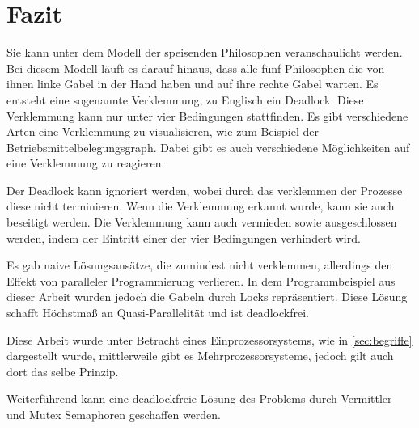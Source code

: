 \chapter{Fazit}
\label{fazit}

Sie kann unter dem Modell der speisenden Philosophen veranschaulicht werden. Bei diesem Modell läuft es darauf hinaus, dass alle fünf Philosophen die von ihnen linke Gabel in der Hand haben und auf ihre rechte Gabel warten. Es entsteht eine sogenannte Verklemmung, zu Englisch ein Deadlock. Diese Verklemmung kann nur unter vier Bedingungen stattfinden. Es gibt verschiedene Arten eine Verklemmung zu visualisieren, wie zum Beispiel der Betriebsmittelbelegungsgraph. Dabei gibt es auch verschiedene Möglichkeiten auf eine Verklemmung zu reagieren. 

Der Deadlock kann ignoriert werden, wobei durch das verklemmen der Prozesse diese nicht terminieren.
Wenn die Verklemmung erkannt wurde, kann sie auch beseitigt werden.
Die Verklemmung kann auch vermieden sowie ausgeschlossen werden, indem der Eintritt einer der vier Bedingungen verhindert wird.

Es gab naive Lösungsansätze, die zumindest nicht verklemmen, allerdings den Effekt von paralleler Programmierung verlieren. 
In dem Programmbeispiel aus dieser Arbeit wurden jedoch die Gabeln durch Locks repräsentiert. Diese Lösung schafft Höchstmaß an Quasi-Parallelität und ist deadlockfrei. 

Diese Arbeit wurde unter Betracht eines Einprozessorsystems, wie in \ref{sec:begriffe}  dargestellt wurde, mittlerweile gibt es Mehrprozessorsysteme, jedoch gilt auch dort das selbe Prinzip.

Weiterführend kann eine deadlockfreie Lösung des Problems durch Vermittler und Mutex Semaphoren geschaffen werden. 